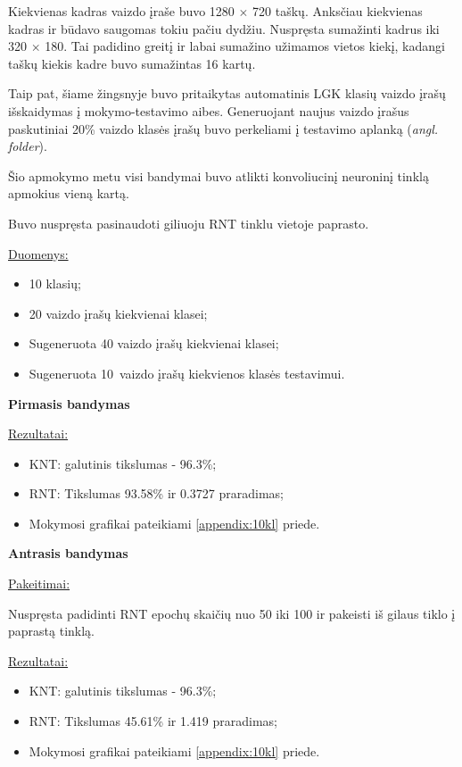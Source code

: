 \documentclass{VUMIFPSbakalaurinis}
\begin{document}
Kiekvienas kadras vaizdo įraše buvo 1280 $\times$ 720 taškų. Anksčiau kiekvienas kadras ir būdavo saugomas tokiu pačiu dydžiu. Nuspręsta sumažinti kadrus iki 320 $\times$ 180. Tai padidino greitį ir labai sumažino užimamos vietos kiekį, kadangi taškų kiekis kadre buvo sumažintas 16 kartų.

Taip pat, šiame žingsnyje buvo pritaikytas automatinis LGK klasių vaizdo įrašų išskaidymas į mokymo-testavimo aibes. Generuojant naujus vaizdo įrašus paskutiniai 20\% vaizdo klasės įrašų buvo perkeliami į testavimo aplanką (\textit{angl. folder}).

Šio apmokymo metu visi bandymai buvo atlikti konvoliucinį neuroninį tinklą apmokius vieną kartą.

Buvo nuspręsta pasinaudoti giliuoju RNT tinklu vietoje paprasto.

\underline{Duomenys:}

\begin{itemize}
	\item 10 klasių;
	\item 20 vaizdo įrašų kiekvienai klasei;
	\item Sugeneruota 40 vaizdo įrašų kiekvienai klasei;
	\item Sugeneruota 10 vaizdo įrašų kiekvienos klasės testavimui.
\end{itemize}

\bigbreak
\textbf{Pirmasis bandymas}

\underline{Rezultatai:}
\begin{itemize}
	\item KNT: galutinis tikslumas - 96.3\%;
	\item RNT: Tikslumas 93.58\% ir 0.3727 praradimas;
	\item Mokymosi grafikai pateikiami \ref{appendix:10kl} priede.
\end{itemize}

\bigbreak
\textbf{Antrasis bandymas}

\underline{Pakeitimai:}

Nuspręsta padidinti RNT epochų skaičių nuo 50 iki 100 ir pakeisti iš gilaus tiklo į paprastą tinklą.

\underline{Rezultatai:}
\begin{itemize}
	\item KNT: galutinis tikslumas - 96.3\%;
	\item RNT: Tikslumas 45.61\% ir 1.419 praradimas;
	\item Mokymosi grafikai pateikiami \ref{appendix:10kl} priede.
\end{itemize}
\end{document}
